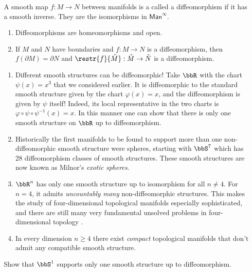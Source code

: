 \begin{defn}[Diffeomorphisms]
    A smooth map $f:M\to N$ between manifolds is a called a diffeomorphism if it has a smooth inverse. They are the isomorphisms in $\mathsf{Man}^\infty$.
\end{defn}
\begin{prop}
\begin{enumerate}
    \item Diffeomorphisms are homeomorphisms and open.
    \item If $M$ and $N$ have boundaries and $f:M\to N$ is a diffeomorphism, then $f(\partial M)=\partial N$ and $\restr{f}{\mathring M}: \mathring M\to \mathring N$ is a diffeomorphism.
\end{enumerate}
\end{prop}
\begin{example}
\begin{enumerate}
    \item Different smooth structures can be diffeomorphic! Take $\bbR $ with the chart $\psi(x)=x^3$ that we considered earlier. It is diffeomorphic to the standard smooth structure given by the chart $\varphi(x)=x$, and the diffeomorphism is given by $\psi$ itself! Indeed, its local representative in the two charts is $\varphi\circ \psi \circ\psi^{-1}(x)=x$. In this manner one can show that there is only one smooth structure on $\bbR$ up to diffeomorphism.
    \item Historically the first manifolds to be found to support more than one non-diffeomorphic smooth structure were spheres, starting with $\bbS^7$ which has 28 diffeomorphism classes of smooth structures. These smooth structures are now known as Milnor's \emph{exotic spheres}.
    \item $\bbR^n$ has only one smooth structure up to isomorphism for all $n\neq 4$. For $n=4$, it admits \emph{uncountably many} non-diffeomorphic structures. This makes the study of four-dimensional topological manifolds especially sophisticated, and there are still many very fundamental unsolved problems in four-dimensional topology \cite{smooth.structures}.
    \item In every dimension $n\geq 4$ there exist \emph{compact} topological manifolds that don't admit any compatible smooth structure.
\end{enumerate}
\end{example}

\begin{xca}
    Show that $\bbS^1$ supports only one smooth structure up to diffeomorphism.
\end{xca}






